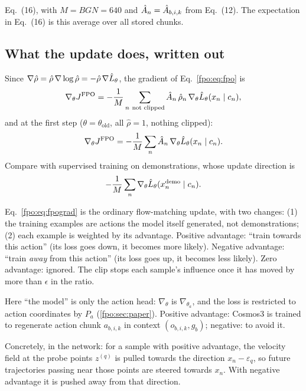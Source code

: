 \begin{paperlink}
Eq.~(16), with $M=BGN=640$ and $\hat A_n=\hat A_{b,i,k}$ from Eq.~(12). The expectation in Eq.~(16) is this average over all stored chunks.
\end{paperlink}

\subsection{What the update does, written out}
Since $\nabla\hat\rho=\hat\rho\,\nabla\log\hat\rho=-\hat\rho\,\nabla\hat L_\theta$, the gradient of Eq.~\eqref{fpo:eq:fpo} is
\begin{equation}
\nabla_\theta J^{\mathrm{FPO}}=-\frac1M\sum_{n\ \text{not clipped}}\Ah_n\,\hat\rho_n\,\nabla_\theta\Lh_\theta(x_n\mid c_n),
\end{equation}
and at the first step ($\theta=\theta_{\mathrm{old}}$, all $\hat\rho=1$, nothing clipped):
\begin{equation}
\nabla_\theta J^{\mathrm{FPO}}=-\frac1M\sum_n\hat A_n\,\nabla_\theta\hat L_\theta(x_n\mid c_n).
\label{fpo:eq:fpograd}
\end{equation}
Compare with supervised training on demonstrations, whose update direction is
\[
-\frac1M\sum_n\nabla_\theta\hat L_\theta(x^{\mathrm{demo}}_n\mid c_n).
\]

\begin{intuition}
Eq.~\eqref{fpo:eq:fpograd} is the ordinary flow-matching update, with two changes: (1) the training examples are actions the model itself generated, not demonstrations; (2) each example is weighted by its advantage. Positive advantage: ``train towards this action'' (its loss goes down, it becomes more likely). Negative advantage: ``train \emph{away} from this action'' (its loss goes up, it becomes less likely). Zero advantage: ignored. The clip stops each sample's influence once it has moved by more than $\epsilon$ in the ratio.
\end{intuition}

\begin{paperlink}
Here ``the model'' is only the action head: $\nabla_\theta$ is $\nabla_{\theta_a}$, and the loss is restricted to action coordinates by $P_a$ (\cref{fpo:sec:paper}). Positive advantage: Cosmos3 is trained to regenerate action chunk $a_{b,i,k}$ in context $(o_{b,i,k},g_b)$; negative: to avoid it.
\end{paperlink}

Concretely, in the network: for a sample with positive advantage, the velocity field at the probe points $z^{(q)}$ is pulled towards the direction $x_n-\varepsilon_q$, so future trajectories passing near those points are steered towards $x_n$. With negative advantage it is pushed away from that direction.

